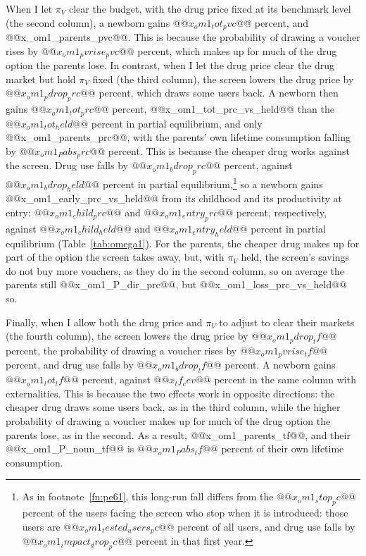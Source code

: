 \documentclass[10pt]{article}
\begin{document}
When I let $\pi_V$ clear the budget, with the drug price fixed at its benchmark level (the second column), a newborn gains $@@x_om1_tot_pvc@@$ percent, and @@x_om1_parents_pvc@@. This is because the probability of drawing a voucher rises by $@@x_om1_pvrise_pvc@@$ percent, which makes up for much of the drug option the parents lose. In contrast, when I let the drug price clear the drug market but hold $\pi_V$ fixed (the third column), the screen lowers the drug price by $@@x_om1_pdrop_prc@@$ percent, which draws some users back. A newborn then gains $@@x_om1_tot_prc@@$ percent, @@x_om1_tot_prc_vs_held@@ than the $@@x_om1_tot_held@@$ percent in partial equilibrium, and only @@x_om1_parents_prc@@, with the parents' own lifetime consumption falling by $@@x_om1_Pabs_prc@@$ percent. This is because the cheaper drug works against the screen. Drug use falls by $@@x_om1_bdrop_prc@@$ percent, against $@@x_om1_bdrop_held@@$ percent in partial equilibrium,\footnote{As in footnote~\ref{fn:pe61}, this long-run fall differs from the $@@x_om1_stop_pc@@$ percent of the users facing the screen who stop when it is introduced: those users are $@@x_om1_tested_users_pc@@$ percent of all users, and drug use falls by $@@x_om1_impact_drop_pc@@$ percent in that first year.} so a newborn gains @@x_om1_early_prc_vs_held@@ from its childhood and its productivity at entry: $@@x_om1_child_prc@@$ and $@@x_om1_entry_prc@@$ percent, respectively, against $@@x_om1_child_held@@$ and $@@x_om1_entry_held@@$ percent in partial equilibrium (Table~\ref{tab:omega1}). For the parents, the cheaper drug makes up for part of the option the screen takes away, but, with $\pi_V$ held, the screen's savings do not buy more vouchers, as they do in the second column, so on average the parents still @@x_om1_P_dir_prc@@, but @@x_om1_loss_prc_vs_held@@ so.

Finally, when I allow both the drug price and $\pi_V$ to adjust to clear their markets (the fourth column), the screen lowers the drug price by $@@x_om1_pdrop_tf@@$ percent, the probability of drawing a voucher rises by $@@x_om1_pvrise_tf@@$ percent, and drug use falls by $@@x_om1_bdrop_tf@@$ percent. A newborn gains $@@x_om1_tot_tf@@$ percent, against $@@x_tf_cev@@$ percent in the same column with externalities. This is because the two effects work in opposite directions: the cheaper drug draws some users back, as in the third column, while the higher probability of drawing a voucher makes up for much of the drug option the parents lose, as in the second. As a result, @@x_om1_parents_tf@@, and their @@x_om1_P_noun_tf@@ is $@@x_om1_Pabs_tf@@$ percent of their own lifetime consumption.
\end{document}
